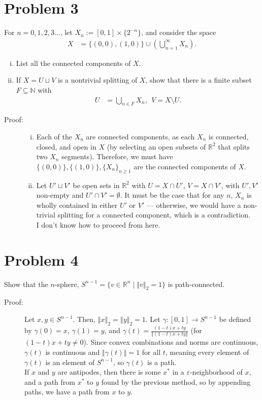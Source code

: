 \documentclass[10pt]{extarticle}
\newcommand{\N}{\mathbb{N}}
\newcommand{\R}{\mathbb{R}}
\newcommand{\norm}[1]{\left\Vert #1\right\Vert}
\begin{document}
  \section{Problem 3}%
  For $n=0,1,2,3\dots$, let $X_n := [0,1]\times \{2^{-n}\}$, and consider the space
  \begin{align*}
    X &= \{(0,0),(1,0)\} \cup \left(\bigcup_{n=1}^{\infty} X_n\right).
  \end{align*}
  \begin{enumerate}[(i)]
    \item List all the connected components of $X$.
    \item If $X = U\sqcup V$ is a nontrivial splitting of $X$, show that there is a finite subset $F\subseteq \N$ with
      \begin{align*}
        U &= \bigcup_{n\in F}X_n,~~V = X\setminus U.
      \end{align*}
  \end{enumerate}
  \begin{description}
    \item[Proof:]\hfill
      \begin{enumerate}[(i)]
        \item Each of the $X_n$ are connected components, as each $X_n$ is connected, closed, and open in $X$ (by selecting an open subsets of $\R^2$ that splits two $X_n$ segments). Therefore, we must have $\{(0,0)\},\{(1,0)\},\{X_n\}_{n\geq 1}$ are the connected components of $X$.
        \item Let $U'\sqcup V'$ be open sets in $\R^2$ with $U = X\cap U'$, $V = X\cap V'$, with $U',V'$ non-empty and $U'\cap V' = \emptyset$. It must be the case that for any $n$, $X_n$ is wholly contained in either $U'$ or $V'$ --- otherwise, we would have a non-trivial splitting for a connected component, which is a contradiction.\\

          I don't know how to proceed from here.
      \end{enumerate}
  \end{description}
  \section{Problem 4}%
  Show that the $n$-sphere, $S^{n-1} = \{v\in \R^n\mid \norm{v}_2 = 1\}$ is path-connected.
  \begin{description}
    \item[Proof:] Let $x,y\in S^{n-1}$. Then, $\norm{x}_{2} = \norm{y}_{2} = 1$. Let $\gamma: [0,1]\rightarrow S^{n-1}$ be defined by $\gamma(0) = x$, $\gamma(1) = y$, and $\gamma(t) = \frac{(1-t)x + ty}{\norm{(1-t)x + ty}}$ (for $(1-t)x + ty \neq 0$). Since convex combinations and norms are continuous, $\gamma(t)$ is continuous and $\norm{\gamma(t)} = 1$ for all $t$, meaning every element of $\gamma(t)$ is an element of $S^{n-1}$, so $\gamma(t)$ is a path.\\

      If $x$ and $y$ are antipodes, then there is some $x^{\ast}$ in a $\varepsilon$-neighborhood of $x$, and a path from $x^{\ast}$ to $y$ found by the previous method, so by appending paths, we have a path from $x$ to $y$.
  \end{description}
\end{document}
